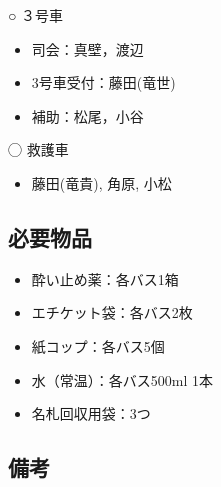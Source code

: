 ○ ３号車
\begin{itemize}
\item 司会：真壁，渡辺
\item 3号車受付：藤田(竜世)
\item 補助：松尾，小谷
\end{itemize}

◯ 救護車
\begin{itemize}
\item 藤田(竜貴), 角原, 小松
\end{itemize}

\subsection{必要物品}
\begin{itemize}
\item 酔い止め薬：各バス1箱
\item エチケット袋：各バス2枚
\item 紙コップ：各バス5個
\item 水（常温）：各バス500ml 1本
\item 名札回収用袋：3つ
\end{itemize}


\subsection{備考}


%
